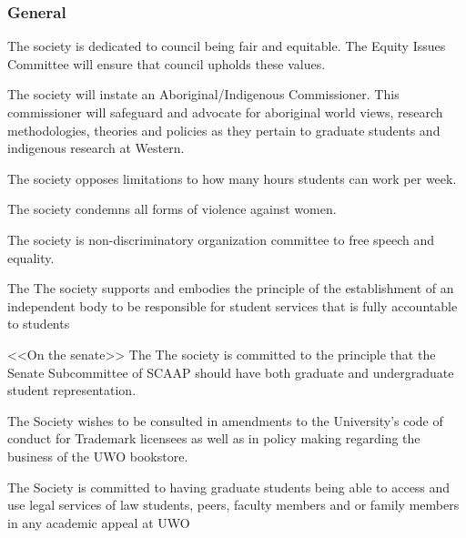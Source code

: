 \subsubsection{General}
\begin{longenum}[ label*=\thesubsubsection.\arabic*., align=left]
\item The society is dedicated to council being fair and equitable. The Equity Issues Committee will ensure that council upholds these values. 
\item The society will instate an Aboriginal/Indigenous Commissioner. This commissioner will safeguard and advocate for aboriginal world views, research methodologies, theories and policies as they pertain to graduate students and indigenous research at Western.
\item The society opposes limitations to how many hours students can work per week.
\item The society condemns all forms of violence against women. 
\item The society is non-discriminatory organization committee to free speech and equality.
\item The The society supports and embodies the principle of the establishment of an independent body to be responsible  for student services that is fully accountable to students 
\item <<On the senate>> The The society  is committed to the principle that the Senate Subcommittee of SCAAP should have both graduate and undergraduate student representation. 
\item The Society wishes to be consulted in amendments to the University's code of conduct for Trademark licensees as well as in policy making regarding the business of the UWO bookstore. 
\item The Society is committed to having graduate students being able to access and use legal services of law students, peers, faculty members and or family members in any academic appeal at UWO 
\end{longenum}


